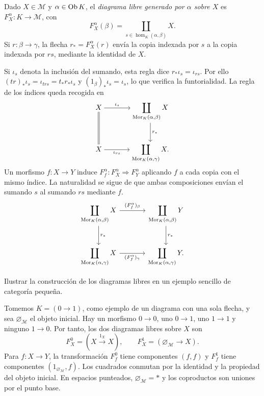 \begin{defi}
Dado $X\in\mathcal M$ y $\alpha\in\operatorname{Ob} K$, el \emph{diagrama libre generado por $\alpha$ sobre $X$} es $F_X^\alpha\colon K\to\mathcal M$, con
\[
F_X^\alpha(\beta)=\coprod_{s\in\hom_K(\alpha,\beta)}X.
\]
Si $r\colon\beta\to\gamma$, la flecha $r_*=F_X^\alpha(r)$ envía la copia indexada por $s$ a la copia indexada por $rs$, mediante la identidad de $X$.
\end{defi}
Si $\iota_s$ denota la inclusión del sumando, esta regla dice $r_*\iota_s=\iota_{rs}$. Por ello $(tr)_*\iota_s=\iota_{trs}=t_*r_*\iota_s$ y $(1_\beta)_*\iota_s=\iota_s$, lo que verifica la funtorialidad. La regla de los índices queda recogida en
\[
\begin{tikzcd}[cramped,column sep=large,row sep=large]
X \arrow[r,"\iota_s"] \arrow[d,equal]
& \displaystyle\coprod_{\hom_K(\alpha,\beta)}X \arrow[d,"r_*"]\\
X \arrow[r,"\iota_{rs}"'] & \displaystyle\coprod_{\hom_K(\alpha,\gamma)}X.
\end{tikzcd}
\]
Un morfismo $f\colon X\to Y$ induce $F_f^\alpha\colon F_X^\alpha\Rightarrow F_Y^\alpha$ aplicando $f$ a cada copia con el mismo índice. La naturalidad se sigue de que ambas composiciones envían el sumando $s$ al sumando $rs$ mediante $f$.
\[
\begin{tikzcd}[column sep=large,row sep=large]
\displaystyle\coprod_{\hom_K(\alpha,\beta)}X \arrow[r,"(F_f^\alpha)_\beta"] \arrow[d,"r_*"]
& \displaystyle\coprod_{\hom_K(\alpha,\beta)}Y \arrow[d,"r_*"]\\
\displaystyle\coprod_{\hom_K(\alpha,\gamma)}X \arrow[r,"(F_f^\alpha)_\gamma"']
& \displaystyle\coprod_{\hom_K(\alpha,\gamma)}Y.
\end{tikzcd}
\]

\begin{ejer}
Ilustrar la construcción de los diagramas libres en un ejemplo sencillo de categoría pequeña.
\end{ejer}
\begin{sol}
Tomemos $K=(0\to1)$, como ejemplo de un diagrama con una sola flecha, y sea $\varnothing_{\mathcal M}$ el objeto inicial. Hay un morfismo $0\to0$, uno $0\to1$, uno $1\to1$ y ninguno $1\to0$. Por tanto, los dos diagramas libres sobre $X$ son
\[
F_X^0=(X\xrightarrow{1_X}X),\qquad
F_X^1=(\varnothing_{\mathcal M}\longrightarrow X).
\]
Para $f\colon X\to Y$, la transformación $F_f^0$ tiene componentes $(f,f)$ y $F_f^1$ tiene componentes $(1_{\varnothing_{\mathcal M}},f)$. Los cuadrados conmutan por la identidad y la propiedad del objeto inicial. En espacios punteados, $\varnothing_{\mathcal M}=*$ y los coproductos son uniones por el punto base.
\end{sol}

